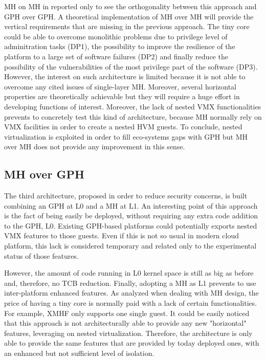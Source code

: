 \documentclass{sig-alternate}
\begin{document}
MH on MH in reported only to see the orthogonality between this approach and GPH over GPH.
A theoretical implementation of MH over MH will provide the vertical requirements that are missing in the previous approach. The tiny core could be able to overcome monolithic problems due to privilege level of adminitration tasks (DP1), the possibility to improve the resilience of the platform to a large set of software failures (DP2) and finally reduce the possibility of the vulnerabilities of the most privilege part of the software (DP3). However, the interest on such architecture is limited because it is not able to overcome any cited issues of single-layer MH. Moreover, several horizontal properties are theoretically achievable but they will require a huge effort in developing functions of interest. Moreover, the lack of nested VMX functionalities prevents to concretely test this kind of architecture, because MH normally rely on VMX facilities in order to create a nested HVM guests.
To conclude, nested virtualization is exploited in order to fill eco-systems gaps with GPH but MH over MH does not provide any improvement in this sense.

\subsection{MH over GPH}
\label{par:mog}

The third architecture, proposed in order to reduce security concerns, is built combining an GPH at L0 and a MH at L1. 
An interesting point of this approach is the fact of being easily be deployed, without requiring any extra code addition to the GPH, L0.  Existing GPH-based platforms could potentially exports nested VMX features to those guests. Even if this is not so usual in modern cloud platform, this lack is considered temporary and related only to the experimental status of those features.

However, the amount of code running in L0 kernel space is still as big as before and, therefore, no TCB reduction. 
Finally, adopting a MH as L1 prevents to use inter-platform enhanced features. As analyzed when dealing with MH design, the price of having a tiny core is normally paid with a lack of certain functionalities. For example, XMHF only supports one single guest. It could be easily noticed that this approach is not architecturally able to provide any new "horizontal" features, leveraging on nested virtualization. Therefore, the architecture is only able to provide the same features that are provided by today deployed ones, with an enhanced but not sufficient level of isolation.
\end{document}
